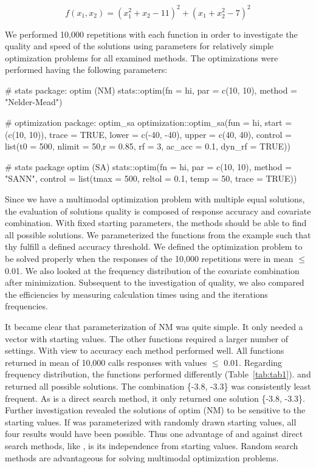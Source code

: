 \begin{equation}
\label{eq:eq2}
f(x_1,x_2)=(x_1^2+x_2-11)^2+(x_1+x_2^2-7)^2
\end{equation}

We performed 10,000 repetitions with each function in order to investigate the quality and speed of the solutions using parameters for relatively simple optimization problems for all examined methods. The optimizations were performed having the following parameters:
    
    \begin{example}
# stats package: optim (NM)
stats::optim(fn = hi, par = c(10, 10), method = "Nelder-Mead")

# optimization package: optim_sa
optimization::optim_sa(fun = hi, start = (c(10, 10)), trace = TRUE, 
                       lower = c(-40, -40), upper = c(40, 40),
                       control = list(t0 = 500, nlimit = 50,r = 0.85,
                                      rf = 3, ac_acc = 0.1, dyn_rf = TRUE))

# stats package optim (SA)
stats::optim(fn = hi, par = c(10, 10), method = "SANN",
             control = list(tmax = 500, reltol = 0.1, temp = 50, trace = TRUE))
\end{example}
Since we have a multimodal optimization problem with multiple equal solutions, the evaluation of solutions quality is composed of response accuracy and covariate combination. With fixed starting parameters, the methods should be able to find all possible solutions. We parameterized the functions from the example such that thy fulfill a defined accuracy threshold. We defined the optimization problem to be solved properly when the responses of the 10,000 repetitions were in mean $\leq$ 0.01. We also looked at the frequency distribution of the covariate combination after minimization. Subsequent to the investigation of quality, we also compared the efficiencies by measuring calculation times using  and the iterations frequencies.

It became clear that parameterization of NM was quite simple. It only needed a vector with starting values. The other functions required a larger number of settings. With view to accuracy each method performed well. All functions returned in mean of 10,000 calls responses with values $\leq$ 0.01. Regarding frequency distribution, the functions performed differently (Table~\ref{tab:tab1}).  and  returned all possible solutions. The combination \{-3.8, -3.3\} was consistently least frequent. As  is a direct search method, it only returned one solution \{-3.8, -3.3\}. Further investigation revealed the solutions of optim (NM) to be sensitive to the starting values. If  was parameterized with randomly drawn starting values, all four results would have been possible. Thus one advantage of  and  against direct search methods, like , is its independence from starting values. Random search methods are advantageous for solving multimodal optimization problems.

